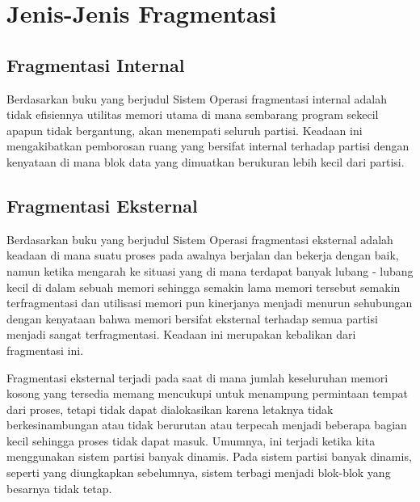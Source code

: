
\section{Jenis-Jenis Fragmentasi}
\subsection{Fragmentasi Internal}
Berdasarkan buku yang berjudul Sistem Operasi \cite{pangera2005sistem} fragmentasi internal adalah tidak efisiennya utilitas memori utama di mana sembarang program sekecil apapun tidak bergantung, akan menempati seluruh partisi. Keadaan ini mengakibatkan pemborosan ruang yang bersifat internal terhadap partisi dengan kenyataan di mana blok data yang dimuatkan berukuran lebih kecil dari partisi.


\subsection{Fragmentasi Eksternal}
Berdasarkan buku yang berjudul Sistem Operasi \cite{pangera2005sistem} fragmentasi eksternal adalah keadaan di mana suatu proses pada awalnya berjalan dan bekerja dengan baik, namun ketika mengarah ke situasi yang di mana terdapat banyak lubang - lubang kecil di dalam sebuah memori sehingga semakin lama memori tersebut semakin terfragmentasi dan utilisasi memori pun kinerjanya menjadi menurun sehubungan dengan kenyataan bahwa memori bersifat eksternal terhadap semua partisi menjadi sangat terfragmentasi. Keadaan ini merupakan kebalikan dari fragmentasi ini.

Fragmentasi eksternal terjadi pada saat di mana jumlah keseluruhan memori kosong yang tersedia memang mencukupi untuk menampung permintaan tempat dari proses, tetapi tidak dapat dialokasikan karena letaknya tidak berkesinambungan atau tidak berurutan atau terpecah menjadi beberapa bagian kecil sehingga proses tidak dapat masuk. 
Umumnya, ini terjadi ketika kita menggunakan sistem partisi banyak dinamis. Pada sistem partisi banyak dinamis, seperti yang diungkapkan sebelumnya, sistem terbagi menjadi blok-blok yang besarnya tidak tetap.
